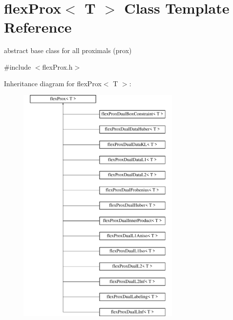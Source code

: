 \hypertarget{classflex_prox}{}\section{flex\+Prox$<$ T $>$ Class Template Reference}
\label{classflex_prox}


abstract base class for all proximals (prox)  




{\ttfamily \#include $<$flex\+Prox.\+h$>$}

Inheritance diagram for flex\+Prox$<$ T $>$\+:\begin{figure}[H]
\begin{center}
\leavevmode
\includegraphics[height=12.000000cm]{classflex_prox}
\end{center}
\end{figure}
